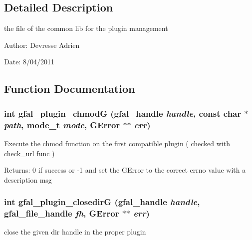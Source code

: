 \subsection{Detailed Description}
the file of the common lib for the plugin management 

\begin{Desc}
\item[Author:]Devresse Adrien \end{Desc}
\begin{Desc}
\item[Date:]8/04/2011 \end{Desc}


\subsection{Function Documentation}
\subsubsection{\setlength{\rightskip}{0pt plus 5cm}int gfal\_\-plugin\_\-chmod\-G (gfal\_\-handle {\em handle}, const char $\ast$ {\em path}, mode\_\-t {\em mode}, GError $\ast$$\ast$ {\em err})}\label{gfal__common__plugin_8c_f9780b8c4a097a65b42aee466a9218e0}


Execute the chmod function on the first compatible plugin ( checked with check\_\-url func ) \begin{Desc}
\item[Returns:]0 if success or -1 and set the GError to the correct errno value with a description msg \end{Desc}
\subsubsection{\setlength{\rightskip}{0pt plus 5cm}int gfal\_\-plugin\_\-closedir\-G (gfal\_\-handle {\em handle}, gfal\_\-file\_\-handle {\em fh}, GError $\ast$$\ast$ {\em err})}\label{gfal__common__plugin_8c_980a66f9ea2946189c0d70f13471900f}


close the given dir handle in the proper plugin 
